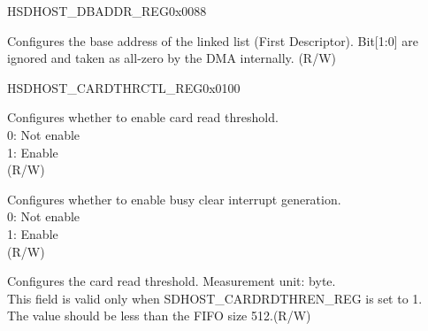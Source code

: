 \begin{register}{H}{SDHOST\_DBADDR\_REG}{0x0088}\label{regdesc:SDHOSTDBADDRREG}
%
\regnewline%
\begin{regdesc}\begin{reglist}
\label{fielddesc:SDHOSTDBADDRREG}\item [SDHOST\_DBADDR\_REG] Configures the base address of the linked list (First Descriptor). Bit[1:0] are ignored and taken as all-zero by the DMA internally. (R/W)
\end{reglist}\end{regdesc}
\end{register}


\begin{register}{H}{SDHOST\_CARDTHRCTL\_REG}{0x0100}\label{regdesc:SDHOSTCARDTHRCTLREG}
%
%
%
%
\regnewline%
\begin{regdesc}\begin{reglist}
\label{fielddesc:SDHOSTCARDRDTHRENREG}\item [SDHOST\_CARDRDTHREN\_REG] Configures whether to enable card read threshold.\\
0: Not enable\\
1: Enable\\(R/W)
\label{fielddesc:SDHOSTCARDCLRINTENREG}\item [SDHOST\_CARDCLRINTEN\_REG] Configures whether to enable busy clear interrupt generation.\\
0: Not enable\\
1: Enable\\(R/W)
\label{fielddesc:SDHOSTCARDTHRESHOLDREG}\item [SDHOST\_CARDTHRESHOLD\_REG] Configures the card read threshold.  Measurement unit: byte. \\
This field is valid only when SDHOST\_CARDRDTHREN\_REG is set to 1.\\
The value should be less than the FIFO size 512.(R/W)
\end{reglist}\end{regdesc}
\end{register}


